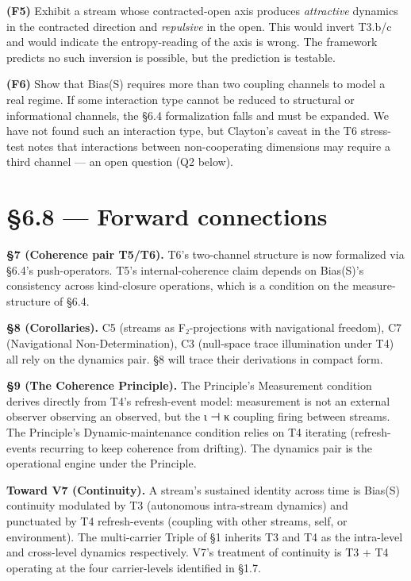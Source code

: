 \documentclass[11pt, openany]{book}
\newcommand{\sectionbreak}{\clearpage}
\begin{document}
\textbf{(F5)} Exhibit a stream whose contracted-open axis produces \textit{attractive} dynamics in the contracted direction and \textit{repulsive} in the open. This would invert T3.b/c and would indicate the entropy-reading of the axis is wrong. The framework predicts no such inversion is possible, but the prediction is testable.

\textbf{(F6)} Show that Bias(S) requires more than two coupling channels to model a real regime. If some interaction type cannot be reduced to structural or informational channels, the §6.4 formalization falls and must be expanded. We have not found such an interaction type, but Clayton's caveat in the T6 stress-test notes that interactions between non-cooperating dimensions may require a third channel --- an open question (Q2 below).

\sectionbreak

\section{§6.8 --- Forward connections}

\textbf{§7 (Coherence pair T5/T6).} T6's two-channel structure is now formalized via §6.4's push-operators. T5's internal-coherence claim depends on Bias(S)'s consistency across kind-closure operations, which is a condition on the measure-structure of §6.4.

\textbf{§8 (Corollaries).} C5 (streams as F₂-projections with navigational freedom), C7 (Navigational Non-Determination), C3 (null-space trace illumination under T4) all rely on the dynamics pair. §8 will trace their derivations in compact form.

\textbf{§9 (The Coherence Principle).} The Principle's Measurement condition derives directly from T4's refresh-event model: measurement is not an external observer observing an observed, but the ι ⊣ κ coupling firing between streams. The Principle's Dynamic-maintenance condition relies on T4 iterating (refresh-events recurring to keep coherence from drifting). The dynamics pair is the operational engine under the Principle.

\textbf{Toward V7 (Continuity).} A stream's sustained identity across time is Bias(S) continuity modulated by T3 (autonomous intra-stream dynamics) and punctuated by T4 refresh-events (coupling with other streams, self, or environment). The multi-carrier Triple of §1 inherits T3 and T4 as the intra-level and cross-level dynamics respectively. V7's treatment of continuity is T3 + T4 operating at the four carrier-levels identified in §1.7.
\end{document}
